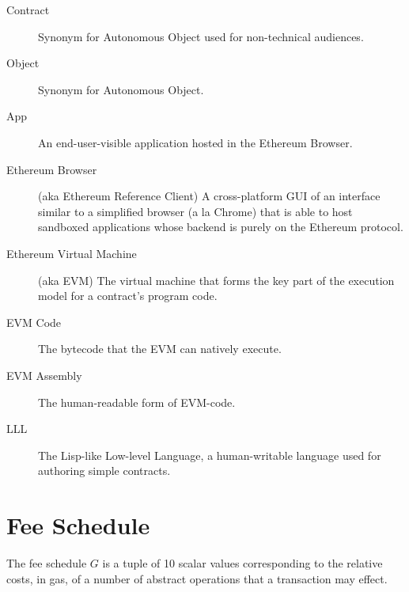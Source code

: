 \documentclass[9pt,oneside]{amsart}
\begin{document}
\begin{description}
\item[Contract] Synonym for Autonomous Object used for non-technical audiences.

\item[Object] Synonym for Autonomous Object.

\item[App] An end-user-visible application hosted in the Ethereum Browser.

\item[Ethereum Browser] (aka Ethereum Reference Client) A cross-platform GUI of an interface similar to a simplified browser (a la Chrome) that is able to host sandboxed applications whose backend is purely on the Ethereum protocol.

\item[Ethereum Virtual Machine] (aka EVM) The virtual machine that forms the key part of the execution model for a contract's program code.

\item[EVM Code] The bytecode that the EVM can natively execute.

\item[EVM Assembly] The human-readable form of EVM-code.

\item[LLL] The Lisp-like Low-level Language, a human-writable language used for authoring simple contracts.

\end{description}

\section{Fee Schedule}\label{app:fees}

The fee schedule $G$ is a tuple of 10 scalar values corresponding to the relative costs, in gas, of a number of abstract operations that a transaction may effect.
\end{document}
